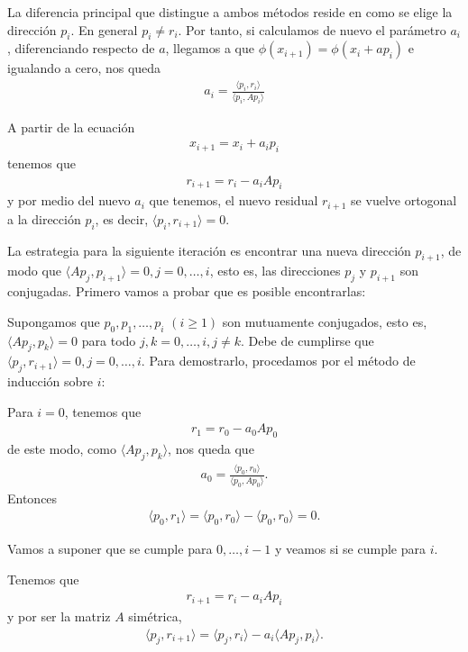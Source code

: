 La diferencia principal que distingue a ambos métodos reside en como se elige la dirección $p_i$. En general $p_i\neq r_i$. Por tanto, si calculamos de nuevo el parámetro $a_i$, diferenciando respecto de $a$, llegamos a que $\phi(x_{i+1})=\phi(x_i+ap_i)$ e igualando a cero, nos queda
\begin{gather*}a_i=\frac{\langle{p_i, r_i\rangle}}{\langle{p_i, Ap_i\rangle}}\end{gather*}

A partir de la ecuación
\begin{gather*}x_{i+1}=x_i+a_ip_i\end{gather*}
tenemos que
\begin{gather*}r_{i+1}=r_i-a_iAp_i\end{gather*}
y por medio del nuevo $a_i$ que tenemos, el nuevo residual $r_{i+1}$ se vuelve ortogonal a la dirección $p_i$, es decir, $\langle{p_i, r_{i+1}\rangle}=0$.

La estrategia para la siguiente iteración es encontrar una nueva dirección $p_{i+1}$, de modo que $\langle{Ap_j, p_{i+1}\rangle}=0, j=0, \ldots, i$, esto es, las direcciones $p_j$ y $p_{i+1}$ son conjugadas. Primero vamos a probar que es posible encontrarlas:

Supongamos que $p_0, p_1, \ldots, p_i$ $(i\geq1)$ son mutuamente conjugados, esto es, $\langle{Ap_j, p_k\rangle}=0$ para todo $j, k=0, \ldots, i, j\neq k$. Debe de cumplirse que $\langle{p_j, r_{i+1}\rangle}=0, j=0, \ldots, i$. Para demostrarlo, procedamos por el método de inducción sobre $i$:

Para $i=0$, tenemos que
\begin{gather*}r_1=r_0-a_0Ap_0\end{gather*}
de este modo, como $\langle{Ap_j, p_k\rangle}$, nos queda que \begin{gather*}a_0=\frac{\langle{p_0, r_0\rangle}}{\langle{p_0, Ap_0\rangle}}.\end{gather*}
Entonces
\begin{gather*}\langle{p_0, r_1\rangle}=\langle{p_0, r_0\rangle}-\langle{p_0, r_0\rangle}=0.\end{gather*}

Vamos a suponer que se cumple para $0, \ldots, i-1$ y veamos si se cumple para $i$.

Tenemos que
\begin{gather*}r_{i+1}=r_i-a_iAp_i\end{gather*}
y por ser la matriz $A$ simétrica,
\begin{gather*}\langle{p_j, r_{i+1}\rangle}=\langle{p_j, r_i\rangle}-a_i\langle{Ap_j, p_i\rangle}.\end{gather*}


